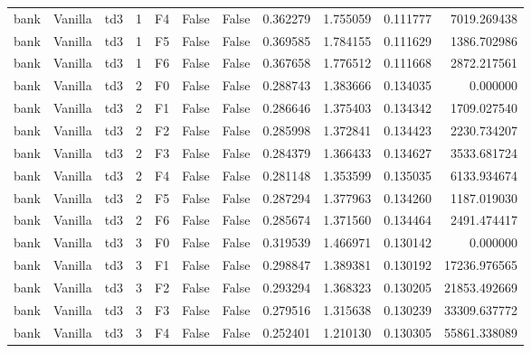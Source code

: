 \begin{tabular}{lllrlllrrrr}
      bank & Vanilla &       td3 &     1 &  F4 &           False &            False &  0.362279 &  1.755059 & 0.111777 &      7019.269438 \\
      bank & Vanilla &       td3 &     1 &  F5 &           False &            False &  0.369585 &  1.784155 & 0.111629 &      1386.702986 \\
      bank & Vanilla &       td3 &     1 &  F6 &           False &            False &  0.367658 &  1.776512 & 0.111668 &      2872.217561 \\
      bank & Vanilla &       td3 &     2 &  F0 &           False &            False &  0.288743 &  1.383666 & 0.134035 &         0.000000 \\
      bank & Vanilla &       td3 &     2 &  F1 &           False &            False &  0.286646 &  1.375403 & 0.134342 &      1709.027540 \\
      bank & Vanilla &       td3 &     2 &  F2 &           False &            False &  0.285998 &  1.372841 & 0.134423 &      2230.734207 \\
      bank & Vanilla &       td3 &     2 &  F3 &           False &            False &  0.284379 &  1.366433 & 0.134627 &      3533.681724 \\
      bank & Vanilla &       td3 &     2 &  F4 &           False &            False &  0.281148 &  1.353599 & 0.135035 &      6133.934674 \\
      bank & Vanilla &       td3 &     2 &  F5 &           False &            False &  0.287294 &  1.377963 & 0.134260 &      1187.019030 \\
      bank & Vanilla &       td3 &     2 &  F6 &           False &            False &  0.285674 &  1.371560 & 0.134464 &      2491.474417 \\
      bank & Vanilla &       td3 &     3 &  F0 &           False &            False &  0.319539 &  1.466971 & 0.130142 &         0.000000 \\
      bank & Vanilla &       td3 &     3 &  F1 &           False &            False &  0.298847 &  1.389381 & 0.130192 &     17236.976565 \\
      bank & Vanilla &       td3 &     3 &  F2 &           False &            False &  0.293294 &  1.368323 & 0.130205 &     21853.492669 \\
      bank & Vanilla &       td3 &     3 &  F3 &           False &            False &  0.279516 &  1.315638 & 0.130239 &     33309.637772 \\
      bank & Vanilla &       td3 &     3 &  F4 &           False &            False &  0.252401 &  1.210130 & 0.130305 &     55861.338089 \\

\end{tabular}
